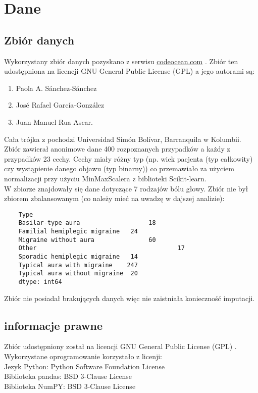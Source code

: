 \section{Dane}
\subsection{Zbiór danych}
Wykorzystany zbiór danych pozyskano z serwisu \url{codeocean.com} \cite{dane}. Zbiór ten udostępniona na licencji GNU General Public License (GPL) a jego autorami są: 

\begin{enumerate}
    \item Paola A. Sánchez-Sánchez
    \item José Rafael García-González
    \item Juan Manuel Rua Ascar. 
\end{enumerate}

\noindent
Cała trójka z pochodzi Universidad Simón Bolívar, Barranquila w Kolumbii.\\

\noindent
Zbiór zawierał anonimowe dane 400 rozpoznanych przypadków a każdy z przypadków 23 cechy. Cechy miały różny typ (np. wiek pacjenta (typ całkowity) czy wystąpienie danego objawu (typ binarny)) co przemawiało za użyciem normalizacji przy użyciu MinMaxScalera z biblioteki Scikit-learn.\\

\noindent
W zbiorze znajdowały się dane dotyczące 7 rodzajów bólu głowy.
Zbiór nie był zbiorem zbalansowanym (co należy mieć na uwadzę w dajszej analizie):

\begin{verbatim}
    Type
    Basilar-type aura 		            18
    Familial hemiplegic migraine   24
    Migraine without aura 		        60
    Other 				                        17
    Sporadic hemiplegic migraine   14
    Typical aura with migraine 	  247
    Typical aura without migraine  20
    dtype: int64
\end{verbatim}

\noindent
Zbiór nie posiadał brakujących danych więc nie zaistniała konieczność imputacji.

\subsection{informacje prawne}
\noindent
Zbiór udostępniony został na licencji GNU General Public License (GPL) \cite{dane}.\\

\noindent
Wykorzystane oprogramowanie korzystało z licenji:\\
\indent Jezyk Python: Python Software Foundation License \cite{python}\\
\indent Biblioteka pandas: BSD 3-Clause License \cite{pandas}\\
\indent Biblioteka NumPY: BSD 3-Clause License \cite{numpy}\\
